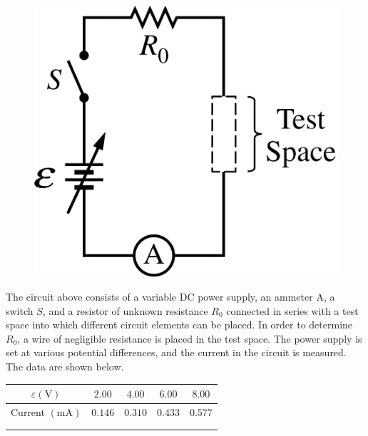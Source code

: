 %
\begin{figure}[H]
\centering
\includegraphics[scale=0.3]{images/img-020-046.png}
\end{figure}


\question
The circuit above consists of a variable DC power supply, an ammeter A, a switch $S$, and a resistor of unknown resistance $R_{0}$ connected in series with a test space into which different circuit elements can be placed. In order to determine $R_{0}$, a wire of negligible resistance is placed in the test space. The power supply is set at various potential differences, and the current in the circuit is measured. The data are shown below. %


\begin{table}[H]
\centering
\begin{tabular}{|c|c|c|c|c|}
\hline$\varepsilon(\mathrm{V})$ & $2.00$ & $4.00$ & $6.00$ & $8.00$ \\
\hline Current $(\mathrm{mA})$ & $0.146$ & $0.310$ & $0.433$ & $0.577$ \\
\hline & & & & \\
\hline & & & & \\
\hline
\end{tabular}
\end{table}


